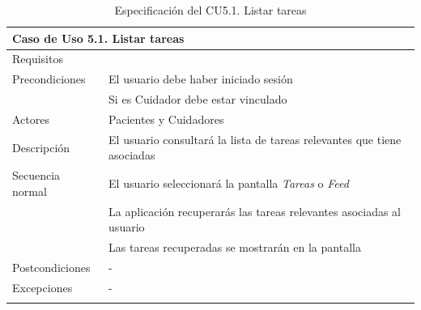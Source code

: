 \begin{longtable}{|p{} p{}|}
    \hline
    \multicolumn{2}{|l|}{\textbf{Caso de Uso 5.1. Listar tareas}} \\ \hline \hline
    Requisitos          & {req:listar_tarea} \\ \hline
    Precondiciones      & El usuario debe haber iniciado sesión \\
                        & Si es Cuidador debe estar vinculado \\ \hline
    Actores             & Pacientes y Cuidadores \\ \hline
    Descripción         & El usuario consultará la lista de tareas relevantes que tiene asociadas \\ \hline
    Secuencia normal    & El usuario seleccionará la pantalla \emph{Tareas} o \emph{Feed} \\
                        & La aplicación recuperarás las tareas relevantes asociadas al usuario \\
                        & Las tareas recuperadas se mostrarán en la pantalla \\ \hline
    Postcondiciones     & - \\ \hline
    Excepciones         & - \\ \hline
    \caption{Especificación del CU5.1. Listar tareas}
    \label{cu:listar_tareas}
\end{longtable}

